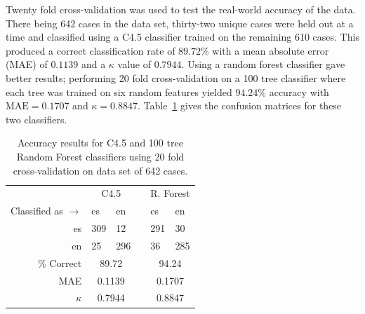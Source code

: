 \documentclass[main.tex]{subfiles}
\begin{document}
Twenty fold cross-validation was used to test the real-world accuracy of the data. There being 642 cases in the data set, thirty-two unique cases were held out at a time and classified using a C4.5 classifier trained on the remaining 610 cases. This produced a correct classification rate of $89.72\%$ with a mean absolute error (MAE) of $0.1139$ and a $\kappa$ value of $0.7944$. Using a random forest classifier gave better results; performing 20 fold cross-validation on a 100 tree classifier where each tree was trained on six random features yielded $94.24\%$ accuracy with $\text{MAE} = 0.1707$ and $\kappa = 0.8847$. Table~\ref{table:dep-results} gives the confusion matrices for these two classifiers.

\begin{table}
\centering
\caption{Accuracy results for C4.5 and 100 tree Random Forest classifiers using 20 fold cross-validation on data set of 642 cases.}
\begin{tabular}{r l l l l l}
\toprule
&\multicolumn{2}{c}{C4.5}& & \multicolumn{2}{c}{R. Forest}\\
\cmidrule{2-3} \cmidrule{5-6}
Classified as $\rightarrow$ & es & en && es & en\\
es &309 & 12 && 291 & 30 \\
en &25 & 296 && 36 & 285 \\
\cmidrule{2-3} \cmidrule{5-6}
\% Correct & \multicolumn{2}{c}{89.72} && \multicolumn{2}{c}{94.24} \\
MAE & \multicolumn{2}{c}{0.1139} && \multicolumn{2}{c}{0.1707} \\
$\kappa$ & \multicolumn{2}{c}{0.7944} && \multicolumn{2}{c}{0.8847} \\
\bottomrule
\end{tabular}

\label{table:dep-results}
\end{table}

\biblio
\end{document}
